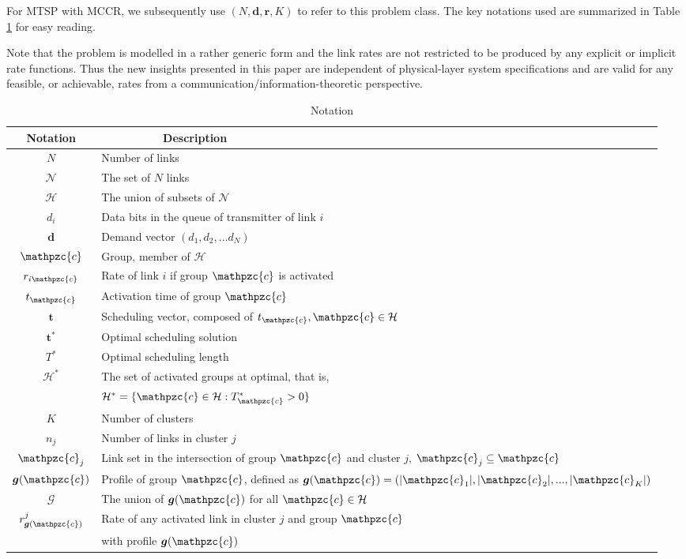 \documentclass[10pt,onecolumn,journal,draftcls,oneside]{IEEEtran}
\newcommand{\CN}{\mathcal{N}}
\newcommand{\CH}{\mathcal{H}}
\newcommand{\Cc}{\mathpzc{c}}
\newcommand{\CG}{\mathcal{G}}
\newcommand{\Bd}{\boldsymbol{d}}
\newcommand{\Br}{\boldsymbol{r}}
\newcommand{\Bt}{\boldsymbol{t}}
\newcommand{\Bg}{\boldsymbol{g}}
\begin{document}
For MTSP with MCCR, we subsequently use $(N, \Bd, \Br, K)$ to refer to this problem class. The key notations used are summarized in Table \ref{tab:notation} for easy reading. 

Note that the problem is modelled in a rather generic form and the link rates are not restricted to be produced by any explicit or implicit rate functions. Thus the new insights presented in this paper are independent of physical-layer system specifications and are valid for any feasible, or achievable, rates from a communication/information-theoretic perspective.

\begin{table}
\caption{Notation}
\vspace{-2mm}
\label{tab:notation}
\centering
\begin{tabular}{ c | l }
\hline
\hline
 Notation  & ~~~~~~~~~ Description \\
\hline
\hline
$N$					& Number of links \\
$\CN$				& The set of $N$ links \\
$\CH$				& The union of subsets of $\CN$ \\
$d_i$				& Data bits in the queue of transmitter of link $i$ \\
$\Bd$				& Demand vector $(d_1,d_2, ... d_N)$ \\  
$\Cc$				& Group, member of $\CH$ \\
$r_{i\Cc}$			& Rate of link $i$ if group $\Cc$ is activated \\
$t_\Cc$				& Activation time of group $\Cc$ \\
$\Bt$				& Scheduling vector, composed of $t_\Cc, \Cc \in \CH$ \\
$\Bt^*$				& Optimal scheduling solution \\
$T^*$				& Optimal scheduling length \\
$\CH^*$				& The set of activated groups at optimal, that is, \\ 
					& $\CH^* = \{\Cc \in \CH: T^*_{\Cc} > 0\}$ \\
$K$					& Number of clusters \\
$n_j$				& Number of links in cluster $j$ \\
$\Cc_j$				& Link set in the intersection of group $\Cc$ and cluster $j$, $\Cc_j \subseteq \Cc$ \\
$\Bg(\Cc)$ 			& Profile of group $\Cc$, defined as $\Bg(\Cc) = (|\Cc_1|, |\Cc_2|, ..., |\Cc_K|)$\\ 
$\CG$ 				& The union of $\Bg(\Cc)$ for all $\Cc \in \CH$ \\
$r^j_{\Bg(\Cc)}$	& Rate of any activated link in cluster $j$ and group $\Cc$ \\ 
					& with profile $\Bg(\Cc)$
\\
\hline
\hline
\end{tabular}
\end{table}
\end{document}
